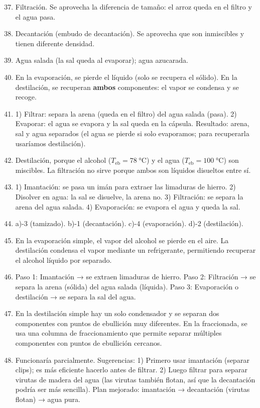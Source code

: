 \documentclass[12pt, a4paper]{article}
\begin{document}
\begin{enumerate}[leftmargin=*, label=\textbf{\arabic*.}]
  \setcounter{enumi}{36}
  \item Filtración. Se aprovecha la diferencia de tamaño: el arroz queda en el filtro y el agua pasa.

  \item Decantación (embudo de decantación). Se aprovecha que son inmiscibles y tienen diferente densidad.

  \item Agua salada (la sal queda al evaporar); agua azucarada.

  \item En la evaporación, se pierde el líquido (solo se recupera el sólido). En la destilación, se recuperan \textbf{ambos} componentes: el vapor se condensa y se recoge.

  \item 1) Filtrar: separa la arena (queda en el filtro) del agua salada (pasa). 2) Evaporar: el agua se evapora y la sal queda en la cápsula. Resultado: arena, sal y agua separados (el agua se pierde si solo evaporamos; para recuperarla usaríamos destilación).

  \item Destilación, porque el alcohol ($T_{\text{eb}} = 78\;°$C) y el agua ($T_{\text{eb}} = 100\;°$C) son miscibles. La filtración no sirve porque ambos son líquidos disueltos entre sí.

  \item 1) Imantación: se pasa un imán para extraer las limaduras de hierro. 2) Disolver en agua: la sal se disuelve, la arena no. 3) Filtración: se separa la arena del agua salada. 4) Evaporación: se evapora el agua y queda la sal.

  \item a)-3 (tamizado). b)-1 (decantación). c)-4 (evaporación). d)-2 (destilación).

  \item En la evaporación simple, el vapor del alcohol se pierde en el aire. La destilación condensa el vapor mediante un refrigerante, permitiendo recuperar el alcohol líquido por separado.

  \item Paso 1: Imantación → se extraen limaduras de hierro. Paso 2: Filtración → se separa la arena (sólida) del agua salada (líquida). Paso 3: Evaporación o destilación → se separa la sal del agua.

  \item En la destilación simple hay un solo condensador y se separan dos componentes con puntos de ebullición muy diferentes. En la fraccionada, se usa una columna de fraccionamiento que permite separar múltiples componentes con puntos de ebullición cercanos.

  \item Funcionaría parcialmente. Sugerencias: 1) Primero usar imantación (separar clips); es más eficiente hacerlo antes de filtrar. 2) Luego filtrar para separar virutas de madera del agua (las virutas también flotan, así que la decantación podría ser más sencilla). Plan mejorado: imantación → decantación (virutas flotan) → agua pura.
\end{enumerate}
\end{document}
